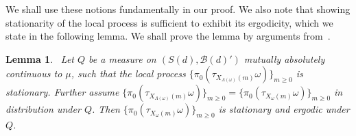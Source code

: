 \documentclass[final]{aomart}
\def\mathscr#1{#1}%
\def\mathbb#1{#1}%
\theoremstyle{plain}
\newtheorem{lemma}[theorem]{Lemma}
\theoremstyle{definition}
\theoremstyle{remark}
\begin{document}
We shall use these notions fundamentally in our proof. We also note that showing stationarity of the local process is sufficient to exhibit its ergodicity, which we state in the following lemma. We shall prove the lemma by arguments from~\cite{BolthausenSznitman2002}.
\begin{lemma}~\label{equivalence}
    Let $\mathbb{Q}$ be a measure on $(\mathscr{S}(d), \mathcal{B}(d)')$ mutually absolutely continuous to
   $\mu$, such that the local process $\{\pi_0(\tau_{X_{\Lambda(\omega)}(m)}\omega)\}_{m \geq 0}$ is stationary. Further assume $\{\pi_0(\tau_{X_{\Lambda(\omega)}(m)}\omega)\}_{m \geq 0}=\{\pi_0(\tau_{X_{\omega}(m)}\omega)\}_{m \geq 0}$ in distribution under $\mathbb{Q}$. Then $\{\pi_0(\tau_{X_{\omega}(m)}\omega)\}_{m \geq 0}$ is stationary and ergodic under $\mathbb{Q}$.
\end{lemma}
\end{document}
